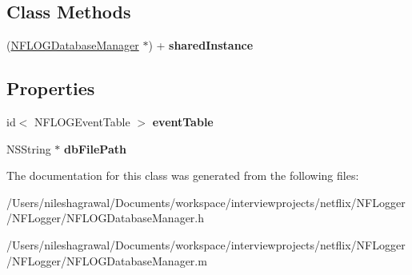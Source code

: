 \subsection*{Class Methods}
\begin{DoxyCompactItemize}
\item 
\mbox{\label{interface_n_f_l_o_g_database_manager_a30813003be61506175fc411043d12b8d}} 
(\hyperlink{interface_n_f_l_o_g_database_manager}{N\+F\+L\+O\+G\+Database\+Manager} $\ast$) + {\bfseries shared\+Instance}
\end{DoxyCompactItemize}
\subsection*{Properties}
\begin{DoxyCompactItemize}
\item 
\mbox{\label{interface_n_f_l_o_g_database_manager_a0c2d72e86efb3d5b8eccef89af7b5662}} 
id$<$ N\+F\+L\+O\+G\+Event\+Table $>$ {\bfseries event\+Table}
\item 
\mbox{\label{interface_n_f_l_o_g_database_manager_ac0b4cda7d0c2ecf6767f74c308cf55c6}} 
N\+S\+String $\ast$ {\bfseries db\+File\+Path}
\end{DoxyCompactItemize}


The documentation for this class was generated from the following files\+:\begin{DoxyCompactItemize}
\item 
/\+Users/nileshagrawal/\+Documents/workspace/interviewprojects/netflix/\+N\+F\+Logger/\+N\+F\+Logger/N\+F\+L\+O\+G\+Database\+Manager.\+h\item 
/\+Users/nileshagrawal/\+Documents/workspace/interviewprojects/netflix/\+N\+F\+Logger/\+N\+F\+Logger/N\+F\+L\+O\+G\+Database\+Manager.\+m\end{DoxyCompactItemize}

